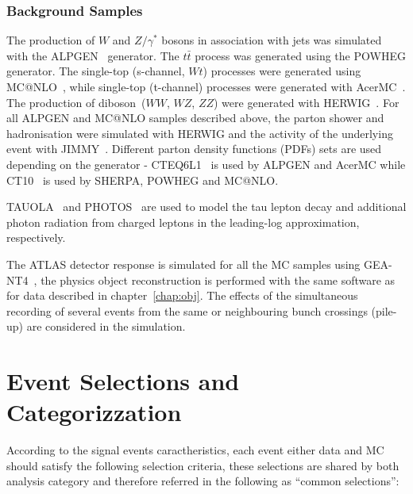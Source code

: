 \subsubsection{Background Samples}
The production of $W$ and $Z/\gamma^*$ bosons in association with jets
was simulated with the ALPGEN~\cite{Alpgen} generator. 
The $t\bar{t}$ process was generated using the POWHEG generator. The single-top (s-channel, $Wt$)
processes were generated using MC@NLO~\cite{MCatNLO}, while single-top
(t-channel) processes were generated with AcerMC~\cite{AcerMC}.  The
production of diboson~($WW$, $WZ$, $ZZ$) were generated with
HERWIG~\cite{Herwig}.  For all ALPGEN and MC@NLO samples described
above, the parton shower and hadronisation were simulated with HERWIG
and the activity of the underlying event with JIMMY~\cite{JIMMY}.
Different parton density functions (PDFs) sets are used depending on
the generator - CTEQ6L1~\cite{CTEQ6} is used by ALPGEN and AcerMC while
CT10~\cite{CT10} is used by SHERPA, POWHEG and MC@NLO. 

TAUOLA~\cite{TAUOLA} and PHOTOS~\cite{PHOTOS} are used to model the
tau lepton decay and additional photon radiation from charged leptons
in the leading-log approximation, respectively.

The ATLAS detector response is simulated for all the MC samples using GEA-NT4~\cite{Geant4,ATLASSIM},
the physics object reconstruction is performed with the same software as for data described in chapter~\ref{chap:obj}.
The effects of the simultaneous recording of several events from the
same or neighbouring bunch crossings (pile-up) are considered in the
simulation. 



\section{Event Selections and Categorizzation}\label{sec:selection}




According to the signal events caractheristics, each event either data and MC should satisfy
the following selection criteria, these selections are shared by both analysis category and therefore 
referred in the following as ``common selections'':


